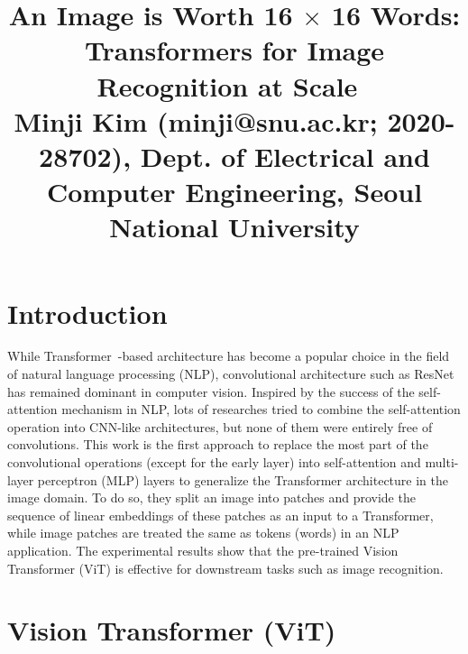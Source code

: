 \documentclass[10pt,twocolumn,letterpaper]{article}
\begin{document}
\title{An Image is Worth 16 $\times$ 16 Words: Transformers for Image Recognition at Scale~\cite{vit} \\ {\rm {\normalsize Minji Kim (minji@snu.ac.kr; 2020-28702), Dept. of Electrical and Computer Engineering, Seoul National University}}}   %

\maketitle
\thispagestyle{empty}


\section{Introduction}
While Transformer~\cite{transformer}-based architecture has become a popular choice in the field of natural language processing (NLP), convolutional architecture such as ResNet has remained dominant in computer vision.
Inspired by the success of the self-attention mechanism in NLP, lots of researches tried to combine the self-attention operation into CNN-like architectures, but none of them were entirely free of convolutions.
This work is the first approach to replace the most part of the convolutional operations (except for the early layer) into self-attention and multi-layer perceptron (MLP) layers to generalize the Transformer architecture in the image domain.
To do so, they split an image into patches and provide the sequence of linear embeddings of these patches as an input to a Transformer, while image patches are treated the same as tokens (words) in an NLP application.
The experimental results show that the pre-trained Vision Transformer (ViT) is effective for downstream tasks such as image recognition.


\section{Vision Transformer (ViT)}
\end{document}
